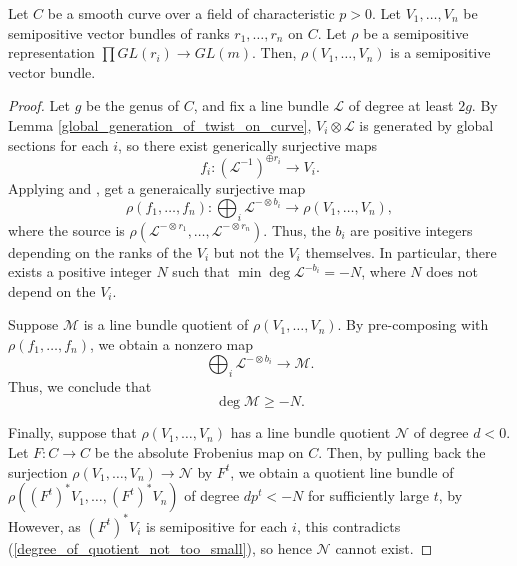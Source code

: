\begin{lemma}
Let $C$ be a smooth curve over a field of characteristic $p>0$. Let $V_1,\ldots,V_n$ be semipositive vector bundles of ranks $r_1,\ldots,r_n$ on $C$. Let $\rho$ be a semipositive representation $\prod GL(r_i)\to GL(m)$. Then, $\rho(V_1,\ldots,V_n)$ is a semipositive vector bundle.
\end{lemma}
\begin{proof}
Let $g$ be the genus of $C$, and fix a line bundle $\mathcal{L}$ of degree at least $2g$.
By Lemma \ref{global_generation_of_twist_on_curve}, $V_i\otimes\mathcal{L}$ is generated by global sections for each $i$, so there exist generically surjective maps
\begin{equation}
f_i:(\mathcal{L}^{-1})^{\oplus r_i}\to V_i.
\end{equation}
Applying  and , get a generaically surjective  map
\begin{equation}
\rho(f_1,\ldots,f_n):\bigoplus_{i}\mathcal{L}^{-\otimes b_i}\to\rho(V_1,\ldots,V_n),
\end{equation}
where the source is $\rho(\mathcal{L}^{-\otimes r_1},\ldots,\mathcal{L}^{-\otimes r_n})$.
Thus, the $b_i$ are positive integers depending on the ranks of the $V_i$ but not the $V_i$ themselves.
In particular, there exists a positive integer $N$ such that $\min\deg\mathcal{L}^{-b_i}=-N$, where $N$ does not depend on the $V_i$.

Suppose $\mathcal{M}$ is a line bundle quotient of $\rho(V_1,\ldots,V_n)$. By pre-composing with $\rho(f_1,\ldots,f_n)$, we obtain a nonzero map
\begin{equation}
\bigoplus_{i}\mathcal{L}^{-\otimes b_i}\to\mathcal{M}.
\end{equation}
Thus, we conclude that
\begin{equation}\label{degree_of_quotient_not_too_small}
\deg\mathcal{M}\ge -N.
\end{equation}

Finally, suppose that $\rho(V_1,\ldots,V_n)$ has a line bundle quotient $\mathcal{N}$ of degree $d<0$. 
Let $F:C\to C$ be the absolute Frobenius map on $C$. 
Then, by pulling back the surjection $\rho(V_1,\ldots,V_n)\to\mathcal{N}$ by $F^t$, we obtain a quotient line bundle of $\rho((F^{t})^{*}V_1,\ldots,(F^{t})^{*}V_n)$ of degree $dp^{t}<-N$ for sufficiently large $t$, by 
However, as $(F^{t})^*V_i$ is semipositive for each $i$, this contradicts (\ref{degree_of_quotient_not_too_small}), so hence $\mathcal{N}$ cannot exist.

\end{proof}

